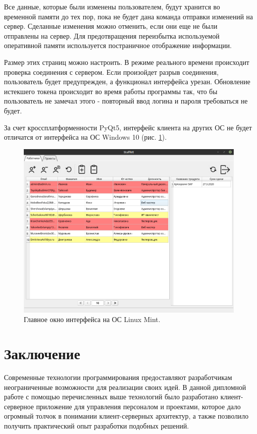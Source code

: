 \documentclass[14pt, a4paper]{extarticle}
\begin{document}
    Все данные, которые были изменены пользователем, будут хранится во временной памяти до тех пор, пока не будет дана команда отправки изменений на сервер. Сделанные изменения можно отменить, если они еще не были отправлены на сервер. Для предотвращения переизбытка используемой оперативной памяти используется постраничное отображение информации.

    Размер этих страниц можно настроить. В режиме реального времени происходит проверка соединения с сервером. Если произойдет разрыв соединения, пользователь будет предупрежден, а функционал интерфейса урезан. Обновление истекшего токена происходит во время работы программы так, что бы пользователь не замечал этого - повторный ввод логина и пароля требоваться не будет.

    За счет кроссплатформенности PyQt5, интерфейс клиента на других ОС не будет отличатся от интерфейса на ОС Windows 10 (рис. \ref{fig:main_window_linux}).
    
    \begin{figure}[h]
        \centering
        \includegraphics[width=1\linewidth]{img/main_window_linux.png}
        \caption{Главное окно интерфейса на ОС Linux Mint.}
        \label{fig:main_window_linux}
    \end{figure}


    \clearpage
    \section{Заключение}
    Современные технологии программирования предоставляют разработчикам неограниченные возможности для реализации своих идей. В данной дипломной работе с помощью перечисленных выше технологий было разработано клиент-серверное приложение для управления персоналом и проектами, которое дало огромный толчок в понимании клиент-серверных архитектур, а также позволило получить практический опыт разработки подобных решений.
\end{document}
